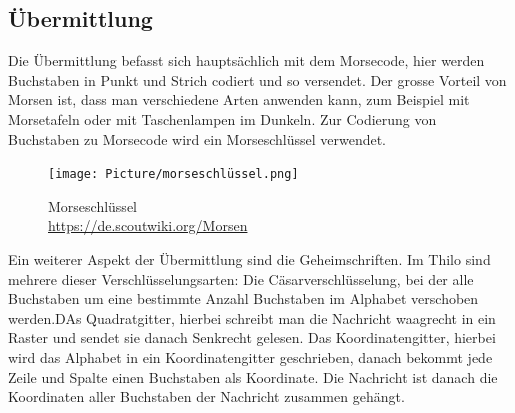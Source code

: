 \subsection*{Übermittlung}
Die Übermittlung befasst sich hauptsächlich mit dem Morsecode, hier werden Buchstaben in Punkt und Strich codiert und so versendet. Der grosse Vorteil von Morsen ist, dass man verschiedene Arten anwenden kann, zum Beispiel mit Morsetafeln oder mit Taschenlampen im Dunkeln. Zur Codierung von Buchstaben zu Morsecode wird ein Morseschlüssel verwendet.
\begin{figure}[h]
    \centering
    \texttt{[image: Picture/morseschlüssel.png]}
\caption{Morseschlüssel \\ \url{https://de.scoutwiki.org/Morsen}}
\end{figure}
\par
Ein weiterer Aspekt der Übermittlung sind die Geheimschriften. Im Thilo \cite{noauthor_thilo_2014} sind mehrere dieser Verschlüsselungsarten: Die Cäsarverschlüsselung, bei der alle Buchstaben um eine bestimmte Anzahl Buchstaben im Alphabet verschoben werden.DAs Quadratgitter, hierbei schreibt man die Nachricht waagrecht in ein Raster und sendet sie danach Senkrecht gelesen. Das Koordinatengitter, hierbei wird das Alphabet in ein Koordinatengitter geschrieben, danach bekommt jede Zeile und Spalte einen Buchstaben als Koordinate. Die Nachricht ist danach die Koordinaten aller Buchstaben der Nachricht zusammen gehängt.
\newpage

